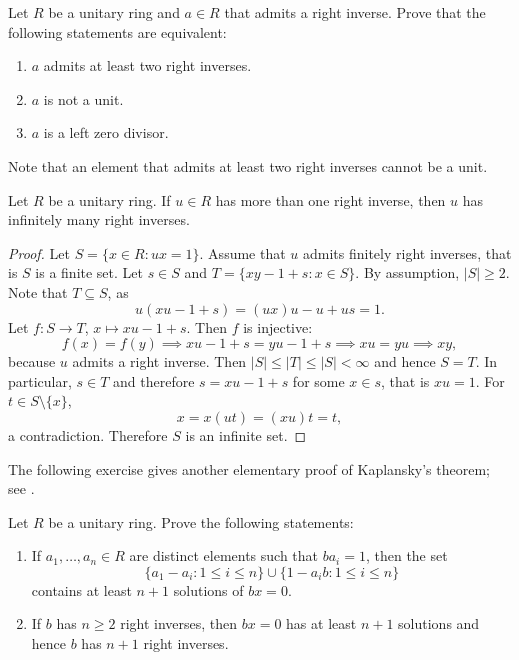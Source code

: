 \begin{exercise}
Let $R$ be a unitary ring and $a\in R$ that admits a right inverse. 
Prove that the following statements are equivalent:
\begin{enumerate}
    \item $a$ admits at least two right inverses. 
    \item $a$ is not a unit. 
    \item $a$ is a left zero divisor. 
\end{enumerate}
\end{exercise}


Note that an element that admits at least two right inverses cannot be a unit. 


\begin{theorem}[Kaplansky]
    Let $R$ be a unitary ring. If $u\in R$ has more than one right inverse, then 
    $u$ has infinitely many right inverses. 
\end{theorem}

\begin{proof}
    Let $S=\{x\in R:ux=1\}$. Assume that $u$ admits finitely right inverses, that is $S$ is a finite set. Let $s\in S$ and
    $T=\{xy-1+s:x\in S\}$. By assumption, 
    $|S|\geq2$. Note that $T\subseteq S$, as 
    \[
    u(xu-1+s)=(ux)u-u+us=1.
    \]
    Let $f\colon S\to T$, $x\mapsto xu-1+s$. Then $f$ is injective:
    \[
    f(x)=f(y)\implies xu-1+s=yu-1+s\implies xu=yu\implies xy,
    \]
    because $u$ admits a right inverse. Then $|S|\leq |T|\leq |S|<\infty$ and 
    hence $S=T$. In particular, $s\in T$ and therefore 
    $s=xu-1+s$ for some $x\in s$, that is $xu=1$. For $t\in S\setminus\{x\}$, 
    \[
    x=x(ut)=(xu)t=t,
    \]
    a contradiction. 
    Therefore $S$ is an infinite set. 
\end{proof}

The following exercise 
gives another elementary proof of Kaplansky's theorem; see \cite{MR1144353}. 

\begin{bonus}
\label{xca:Rosenholtz}
    Let $R$ be a unitary ring. Prove the following statements:
    \begin{enumerate}
        \item If $a_1,\dots,a_n\in R$ are distinct elements such that $ba_i=1$, then 
            the set 
            \[
            \{a_1-a_i:1\leq i\leq n\}\cup \{1-a_ib:1\leq i\leq n\}
            \]
            contains at least $n+1$ solutions of $bx=0$. 
        \item If $b$ has $n\geq2$ right inverses, then $bx=0$ has at least $n+1$ solutions and hence
            $b$ has $n+1$ right inverses. 
    \end{enumerate}
\end{bonus}

